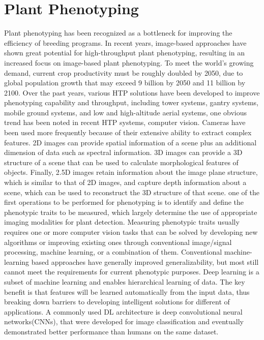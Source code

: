 

\section{Plant Phenotyping}

Plant phenotyping has been recognized as a bottleneck \cite{4152816} for improving the efficiency of breeding programs. In recent years, image-based approaches
have shown great potential for high-throughput plant phenotyping, resulting in an increased focus on image-based plant phenotyping.
To meet the world's growing demand, current crop productivity must be roughly doubled by 2050, due to global population growth that may exceed
9 billion by 2050 and 11 billion by 2100. Over the past years, various HTP solutions have been developed to improve phenotyping capability
and throughput, including tower systems, gantry systems, mobile ground systems, and low and high-altitude aerial systems, one obvious trend
has been noted in recent HTP systems, computer vision. Cameras have been used more frequently because of their extensive ability to extract
complex features. 2D images can provide spatial information of a scene plus an additional dimension of data such as spectral information.
3D images can provide a 3D structure of a scene that can be used to calculate morphological features of objects. Finally, 2.5D images retain
information about the image plane structure, which is similar to that of 2D images, and capture depth information about a scene, which can
be used to reconstruct the 3D structure of that scene. one of the first operations to be performed for phenotyping is to identify and
define the phenotypic traits to be measured, which largely determine the use of appropriate imaging modalities for plant detection.
Measuring phenotypic traits usually requires one or more computer vision tasks that can be solved by developing new algorithms or
improving existing ones through conventional image/signal processing, machine learning, or a combination of them. Conventional machine-learning
based approaches have generally improved generalizability, but most still cannot meet the requirements for current phenotypic purposes.
Deep learning is a subset of machine learning and enables hierarchical learning of data. The key benefit is that features will be learned
automatically from the input data, thus breaking down barriers to developing intelligent solutions for different of applications.
A commonly used DL architecture is deep convolutional neural networks(CNNs)\cite{fukushima1982neocognitron}, that were developed for image classification and eventually
demonstrated better performance than humans on the same dataset.

